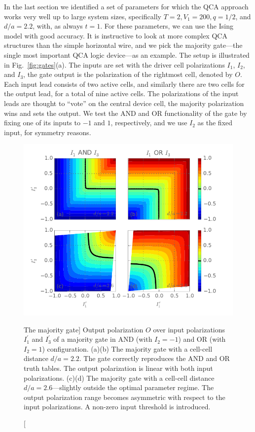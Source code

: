 In the last section we identified a set of parameters for which the QCA approach
works very well up to large system sizes, specifically $T = 2, V_1 = 200, q =
1/2$, and $d/a = 2.2$, with, as always $t = 1$. For these parameters, we can use
the Ising model with good accuracy. It is instructive to look at more complex
QCA structures than the simple horizontal wire, and we pick the majority
gate---the single most important QCA logic device---as an example. The setup is
illustrated in Fig.~\ref{fig:gates}(a). The inputs are set with the driver cell
polarizations $I_1$, $I_2$, and $I_3$, the gate output is the polarization of
the rightmost cell, denoted by $O$. Each input lead consists of two active
cells, and similarly there are two cells for the output lead, for a total of
nine active cells. The polarizations of the input leads are thought to ``vote''
on the central device cell, the majority polarization wins and sets the output.
We test the AND and OR functionality of the gate by fixing one of its inputs to
$-1$ and $1$, respectively, and we use $I_2$ as the fixed input, for symmetry
reasons.

\begin{figure}
  \center
  \includegraphics{majority_gate_contour}
  \caption
  [The majority gate]
  {
  Output polarization $O$ over input polarizations $I_1^{\prime}$ and
  $I_3^{\prime}$ of a majority gate in AND (with $I_2 = -1$) and OR (with $I_2 =
  1$) configuration. (a)(b) The majority gate with a cell-cell distance $d/a =
  2.2$. The gate correctly reproduces the AND and OR truth tables. The output
  polarization is linear with both input polarizations. (c)(d) The majority gate with
  a cell-cell distance $d/a = 2.6$---slightly outside the optimal parameter
  regime. The output polarization range becomes asymmetric with respect to the
  input polarizations. A non-zero input threshold is introduced.
  }
  \label{fig:majority_gate_contour}
\end{figure}

